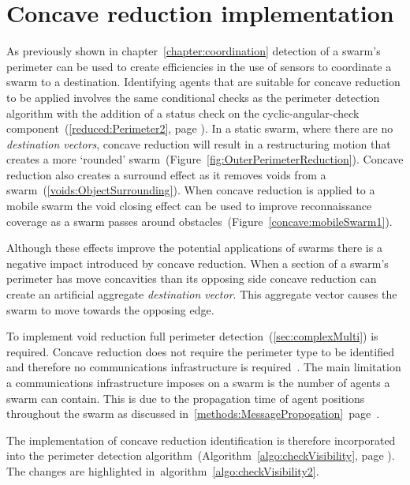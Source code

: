 \section{Concave reduction implementation}\label{sec:ConcaveReductionImp}
As previously shown in chapter~\ref{chapter:coordination} detection of a swarm's perimeter can be used to create efficiencies in the use of sensors to coordinate a swarm to a destination. Identifying agents that are suitable for concave reduction to be applied involves the same conditional checks as the perimeter detection algorithm with the addition of a status check on the cyclic-angular-check component~(\autoref{reduced:Perimeter2}, page \pageref{reduced:Perimeter2}). In a static swarm, where there are no \textit{destination vectors}, concave reduction will result in a restructuring motion that creates a more `rounded' swarm~(Figure~\ref{fig:OuterPerimeterReduction}). Concave reduction also creates a surround effect as it removes voids from a swarm~(\autoref{voids:ObjectSurrounding}). When concave reduction is applied to a mobile swarm the void closing effect can be used to improve reconnaissance coverage as a swarm passes around obstacles~(Figure~\ref{concave:mobileSwarm1}).

Although these effects improve the potential applications of swarms there is a negative impact introduced by concave reduction. When a section of a swarm's perimeter has move concavities than its opposing side concave reduction can create an artificial aggregate \textit{destination vector}. This aggregate vector causes the swarm to move towards the opposing edge. 

To implement void reduction full perimeter detection~(\autoref{sec:complexMulti}) is required. Concave reduction does not require the perimeter type to be identified and therefore no communications infrastructure is required~\cite{MD:09,NIM:09,SOM:12,ZFG:13,JG:13}. The main limitation a communications infrastructure imposes on a swarm is the number of agents a swarm can contain. This is due to the propagation time of agent positions throughout the swarm as discussed in~\autoref{methods:MessagePropogation}~page~\pageref{methods:MessagePropogation}. 

The implementation of concave reduction identification is therefore incorporated into the perimeter detection algorithm~(Algorithm~\ref{algo:checkVisibility}, page \pageref{algo:checkVisibility}). The changes are highlighted in~algorithm~\ref{algo:checkVisibility2}.\\

